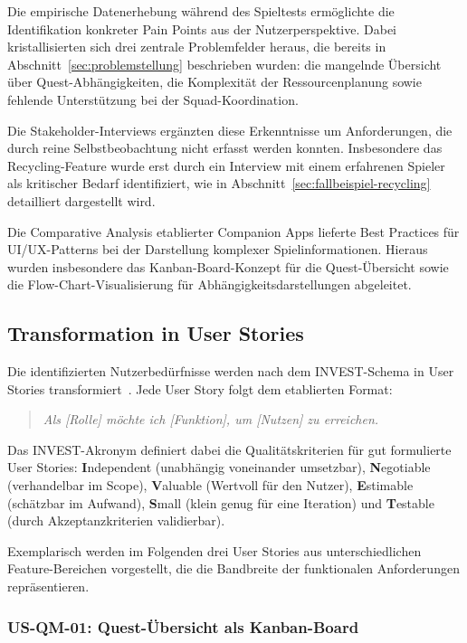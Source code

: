 Die empirische Datenerhebung während des Spieltests ermöglichte die Identifikation konkreter Pain Points aus der Nutzerperspektive. Dabei kristallisierten sich drei zentrale Problemfelder heraus, die bereits in Abschnitt~\ref{sec:problemstellung} beschrieben wurden: die mangelnde Übersicht über Quest-Abhängigkeiten, die Komplexität der Ressourcenplanung sowie fehlende Unterstützung bei der Squad-Koordination.

Die Stakeholder-Interviews ergänzten diese Erkenntnisse um Anforderungen, die durch reine Selbstbeobachtung nicht erfasst werden konnten. Insbesondere das Recycling-Feature wurde erst durch ein Interview mit einem erfahrenen Spieler als kritischer Bedarf identifiziert, wie in Abschnitt~\ref{sec:fallbeispiel-recycling} detailliert dargestellt wird.

Die Comparative Analysis etablierter Companion Apps lieferte Best Practices für \ac{UI}/\ac{UX}-Patterns bei der Darstellung komplexer Spielinformationen. Hieraus wurden insbesondere das Kanban-Board-Konzept für die Quest-Übersicht sowie die Flow-Chart-Visualisierung für Abhängigkeitsdarstellungen abgeleitet.

\subsection{Transformation in User Stories}
\label{sec:userstories}

Die identifizierten Nutzerbedürfnisse werden nach dem \ac{INVEST}-Schema in User Stories transformiert~\cite{wake2003invest}. Jede User Story folgt dem etablierten Format:

\begin{quote}
\textit{\glqq Als [Rolle] möchte ich [Funktion], um [Nutzen] zu erreichen.\grqq{}}
\end{quote}

Das \ac{INVEST}-Akronym definiert dabei die Qualitätskriterien für gut formulierte User Stories: \textbf{I}ndependent (unabhängig voneinander umsetzbar), \textbf{N}egotiable (verhandelbar im Scope), \textbf{V}aluable (Wertvoll für den Nutzer), \textbf{E}stimable (schätzbar im Aufwand), \textbf{S}mall (klein genug für eine Iteration) und \textbf{T}estable (durch Akzeptanzkriterien validierbar).

Exemplarisch werden im Folgenden drei User Stories aus unterschiedlichen Feature-Bereichen vorgestellt, die die Bandbreite der funktionalen Anforderungen repräsentieren.

\subsubsection{US-QM-01: Quest-Übersicht als Kanban-Board}

